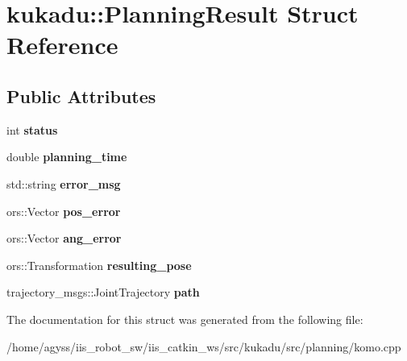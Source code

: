 \hypertarget{structkukadu_1_1PlanningResult}{}\section{kukadu\+:\+:Planning\+Result Struct Reference}
\label{structkukadu_1_1PlanningResult}
\subsection*{Public Attributes}
\begin{DoxyCompactItemize}
\item 
int {\bfseries status}\hypertarget{structkukadu_1_1PlanningResult_a238a84bbd998d9b3701bf666ac5d8ba6}{}\label{structkukadu_1_1PlanningResult_a238a84bbd998d9b3701bf666ac5d8ba6}

\item 
double {\bfseries planning\+\_\+time}\hypertarget{structkukadu_1_1PlanningResult_a02103729c4ffc12165da119ae579b031}{}\label{structkukadu_1_1PlanningResult_a02103729c4ffc12165da119ae579b031}

\item 
std\+::string {\bfseries error\+\_\+msg}\hypertarget{structkukadu_1_1PlanningResult_a7ed78dad65f83f599bea93dca3e8b6ed}{}\label{structkukadu_1_1PlanningResult_a7ed78dad65f83f599bea93dca3e8b6ed}

\item 
ors\+::\+Vector {\bfseries pos\+\_\+error}\hypertarget{structkukadu_1_1PlanningResult_a7617e4928b2693f13710b188bd1bbee7}{}\label{structkukadu_1_1PlanningResult_a7617e4928b2693f13710b188bd1bbee7}

\item 
ors\+::\+Vector {\bfseries ang\+\_\+error}\hypertarget{structkukadu_1_1PlanningResult_abba70d0ec526a5f046e576a9957deb3c}{}\label{structkukadu_1_1PlanningResult_abba70d0ec526a5f046e576a9957deb3c}

\item 
ors\+::\+Transformation {\bfseries resulting\+\_\+pose}\hypertarget{structkukadu_1_1PlanningResult_a257086a8a6f9b7f60ef13c7e292ef49e}{}\label{structkukadu_1_1PlanningResult_a257086a8a6f9b7f60ef13c7e292ef49e}

\item 
trajectory\+\_\+msgs\+::\+Joint\+Trajectory {\bfseries path}\hypertarget{structkukadu_1_1PlanningResult_af28ca675c81bfef28c15082fcc742053}{}\label{structkukadu_1_1PlanningResult_af28ca675c81bfef28c15082fcc742053}

\end{DoxyCompactItemize}


The documentation for this struct was generated from the following file\+:\begin{DoxyCompactItemize}
\item 
/home/agyss/iis\+\_\+robot\+\_\+sw/iis\+\_\+catkin\+\_\+ws/src/kukadu/src/planning/komo.\+cpp\end{DoxyCompactItemize}
